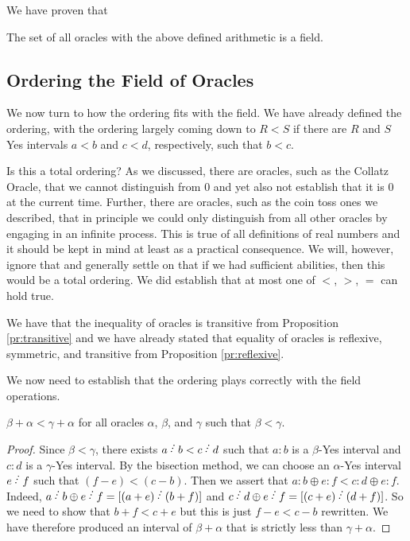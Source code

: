 \documentclass[12pt]{article}
\begin{document}
We have proven that

\begin{theorem}
The set of all oracles with the above defined arithmetic is a field. 
\end{theorem}

\subsection{Ordering the Field of Oracles}

We now turn to how the ordering fits with the field. We have already defined the ordering, with the ordering largely coming down to $R < S$ if there are $R$ and $S$ Yes intervals $a<b$ and $c<d$, respectively, such that $b<c$. 

Is this a total ordering? As we discussed, there are oracles, such as the Collatz Oracle, that we cannot distinguish from 0 and yet also not establish that it is 0 at the current time. Further, there are oracles, such as the coin toss ones we described, that in principle we could only distinguish from all other oracles by engaging in an infinite process. This is true of all definitions of real numbers and it should be kept in mind at least as a practical consequence. We will, however,  ignore that and generally settle on that if we had sufficient abilities, then this would be a total ordering. We did establish that at most one of $<$, $>$, $=$ can hold true. 

We have that the inequality of oracles is transitive from Proposition \ref{pr:transitive} and we have already stated that equality of oracles is reflexive, symmetric, and transitive from Proposition \ref{pr:reflexive}. 

We now need to establish that the ordering plays correctly with the field operations. 

\begin{proposition}\label{pr:addinq}
 $\beta + \alpha< \gamma + \alpha$ for all oracles $\alpha$, $\beta$, and $\gamma$ such that $\beta < \gamma$.
\end{proposition}

\begin{proof}
Since $\beta < \gamma$, there exists $a\lte b< c\lte d$ such that $a:b$ is a $\beta$-Yes interval and $c:d$ is a $\gamma$-Yes interval. By the bisection method, we can choose an $\alpha$-Yes interval $e\lte f$ such that $ (f-e) <  (c-b)$. Then we assert that $a:b \oplus e:f  < c:d \oplus e:f$. Indeed, $a \lte b \oplus e \lte f = [(a+e) \lte (b+f)]$ and $c \lte d \oplus e \lte f = [(c+e)\lte (d+f)]$. So we need to show that $b+f < c+e$ but this is just $f-e < c-b$ rewritten. We have therefore produced an interval of $\beta+\alpha$ that is strictly less than $\gamma+\alpha$. 
\end{proof}
\end{document}
